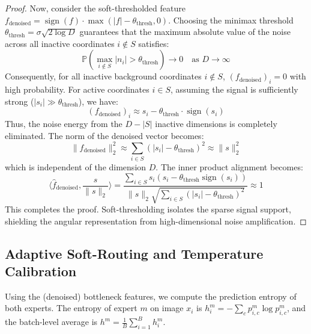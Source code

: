 \documentclass{article}
\theoremstyle{plain}
\theoremstyle{definition}
\theoremstyle{remark}
\begin{document}
\begin{proof}
Now, consider the soft-thresholded feature $f_{\text{denoised}} = \operatorname{sign}(f) \cdot \max(|f| - \theta_{\text{thresh}}, 0)$. Choosing the minimax threshold $\theta_{\text{thresh}} = \sigma \sqrt{2 \log D}$ guarantees that the maximum absolute value of the noise across all inactive coordinates $i \notin S$ satisfies:
\begin{equation}
    \mathbb{P}\left(\max_{i \notin S} |n_i| > \theta_{\text{thresh}}\right) \to 0 \quad \text{as } D \to \infty
\end{equation}
Consequently, for all inactive background coordinates $i \notin S$, $(f_{\text{denoised}})_i = 0$ with high probability. For active coordinates $i \in S$, assuming the signal is sufficiently strong ($|s_i| \gg \theta_{\text{thresh}}$), we have:
\begin{equation}
    (f_{\text{denoised}})_i \approx s_i - \theta_{\text{thresh}} \cdot \operatorname{sign}(s_i)
\end{equation}
Thus, the noise energy from the $D - |S|$ inactive dimensions is completely eliminated. The norm of the denoised vector becomes:
\begin{equation}
    \|f_{\text{denoised}}\|_2^2 \approx \sum_{i \in S} (|s_i| - \theta_{\text{thresh}})^2 \approx \|s\|_2^2
\end{equation}
which is independent of the dimension $D$. The inner product alignment becomes:
\begin{equation}
    \langle \hat{f}_{\text{denoised}}, \frac{s}{\|s\|_2} \rangle = \frac{\sum_{i \in S} s_i (s_i - \theta_{\text{thresh}} \operatorname{sign}(s_i))}{\|s\|_2 \sqrt{\sum_{i \in S} (|s_i| - \theta_{\text{thresh}})^2}} \approx 1
\end{equation}
This completes the proof. Soft-thresholding isolates the sparse signal support, shielding the angular representation from high-dimensional noise amplification.
\end{proof}

\subsection{Adaptive Soft-Routing and Temperature Calibration}
Using the (denoised) bottleneck features, we compute the prediction entropy of both experts. The entropy of expert $m$ on image $x_i$ is $h_i^m = -\sum_c p_{i,c}^m \log p_{i,c}^m$, and the batch-level average is $h^m = \frac{1}{B}\sum_{i=1}^B h_i^m$.
\end{document}
